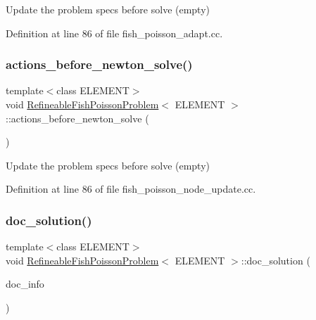 Update the problem specs before solve (empty) 



Definition at line 86 of file fish\+\_\+poisson\+\_\+adapt.\+cc.

\mbox{\label{classRefineableFishPoissonProblem_a58098181f3b88c2fc65f24fb15c1a529}} 
\subsubsection{\texorpdfstring{actions\+\_\+before\+\_\+newton\+\_\+solve()}{actions\_before\_newton\_solve()}\hspace{0.1cm}{\footnotesize\ttfamily [2/2]}}
{\footnotesize\ttfamily template$<$class E\+L\+E\+M\+E\+NT$>$ \\
void \hyperlink{classRefineableFishPoissonProblem}{Refineable\+Fish\+Poisson\+Problem}$<$ E\+L\+E\+M\+E\+NT $>$\+::actions\+\_\+before\+\_\+newton\+\_\+solve (\begin{DoxyParamCaption}{ }\end{DoxyParamCaption})\hspace{0.3cm}{\ttfamily [inline]}}



Update the problem specs before solve (empty) 



Definition at line 86 of file fish\+\_\+poisson\+\_\+node\+\_\+update.\+cc.

\mbox{\label{classRefineableFishPoissonProblem_aeee1bf23216971b50b8822c45e62c48b}} 
\subsubsection{\texorpdfstring{doc\+\_\+solution()}{doc\_solution()}\hspace{0.1cm}{\footnotesize\ttfamily [1/2]}}
{\footnotesize\ttfamily template$<$class E\+L\+E\+M\+E\+NT$>$ \\
void \hyperlink{classRefineableFishPoissonProblem}{Refineable\+Fish\+Poisson\+Problem}$<$ E\+L\+E\+M\+E\+NT $>$\+::doc\+\_\+solution (\begin{DoxyParamCaption}\item[{Doc\+Info \&}]{doc\+\_\+info }\end{DoxyParamCaption})}



